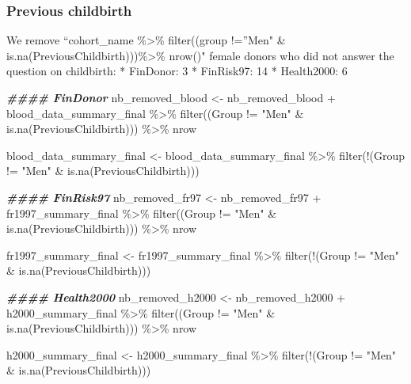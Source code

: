 \documentclass[
]{article}
\newenvironment{Shaded}{\begin{snugshade}}{\end{snugshade}}
\newcommand{\DocumentationTok}[1]{\textcolor[rgb]{0.56,0.35,0.01}{\textbf{\textit{#1}}}}
\newcommand{\FunctionTok}[1]{\textcolor[rgb]{0.00,0.00,0.00}{#1}}
\newcommand{\NormalTok}[1]{#1}
\newcommand{\OtherTok}[1]{\textcolor[rgb]{0.56,0.35,0.01}{#1}}
\newcommand{\SpecialCharTok}[1]{\textcolor[rgb]{0.00,0.00,0.00}{#1}}
\newcommand{\StringTok}[1]{\textcolor[rgb]{0.31,0.60,0.02}{#1}}
\begin{document}
\hypertarget{previous-childbirth}{%
\subsubsection{Previous childbirth}\label{previous-childbirth}}

We remove ``cohort\_name \%\textgreater\% filter((group !=''Men" \&
is.na(PreviousChildbirth)))\%\textgreater\% nrow()" female donors who
did not answer the question on childbirth: * FinDonor: 3 * FinRisk97: 14
* Health2000: 6

\begin{Shaded}
\begin{Highlighting}[]
\DocumentationTok{\#\#\#\# FinDonor}
\NormalTok{nb\_removed\_blood }\OtherTok{\textless{}{-}}\NormalTok{ nb\_removed\_blood }\SpecialCharTok{+}
\NormalTok{                            blood\_data\_summary\_final }\SpecialCharTok{\%\textgreater{}\%} \FunctionTok{filter}\NormalTok{((Group }\SpecialCharTok{!=} \StringTok{"Men"} \SpecialCharTok{\&} \FunctionTok{is.na}\NormalTok{(PreviousChildbirth))) }\SpecialCharTok{\%\textgreater{}\%}\NormalTok{ nrow }

\NormalTok{blood\_data\_summary\_final }\OtherTok{\textless{}{-}}\NormalTok{ blood\_data\_summary\_final }\SpecialCharTok{\%\textgreater{}\%} 
  \FunctionTok{filter}\NormalTok{(}\SpecialCharTok{!}\NormalTok{(Group }\SpecialCharTok{!=} \StringTok{"Men"} \SpecialCharTok{\&} \FunctionTok{is.na}\NormalTok{(PreviousChildbirth)))}

\DocumentationTok{\#\#\#\# FinRisk97}
\NormalTok{nb\_removed\_fr97 }\OtherTok{\textless{}{-}}\NormalTok{ nb\_removed\_fr97 }\SpecialCharTok{+}
\NormalTok{                            fr1997\_summary\_final }\SpecialCharTok{\%\textgreater{}\%} \FunctionTok{filter}\NormalTok{((Group }\SpecialCharTok{!=} \StringTok{"Men"} \SpecialCharTok{\&} \FunctionTok{is.na}\NormalTok{(PreviousChildbirth))) }\SpecialCharTok{\%\textgreater{}\%}\NormalTok{ nrow }

\NormalTok{fr1997\_summary\_final }\OtherTok{\textless{}{-}}\NormalTok{ fr1997\_summary\_final }\SpecialCharTok{\%\textgreater{}\%} 
  \FunctionTok{filter}\NormalTok{(}\SpecialCharTok{!}\NormalTok{(Group }\SpecialCharTok{!=} \StringTok{"Men"} \SpecialCharTok{\&} \FunctionTok{is.na}\NormalTok{(PreviousChildbirth)))}

\DocumentationTok{\#\#\#\# Health2000}
\NormalTok{nb\_removed\_h2000 }\OtherTok{\textless{}{-}}\NormalTok{ nb\_removed\_h2000 }\SpecialCharTok{+}
\NormalTok{                            h2000\_summary\_final }\SpecialCharTok{\%\textgreater{}\%} \FunctionTok{filter}\NormalTok{((Group }\SpecialCharTok{!=} \StringTok{"Men"} \SpecialCharTok{\&} \FunctionTok{is.na}\NormalTok{(PreviousChildbirth))) }\SpecialCharTok{\%\textgreater{}\%}\NormalTok{ nrow }

\NormalTok{h2000\_summary\_final }\OtherTok{\textless{}{-}}\NormalTok{ h2000\_summary\_final }\SpecialCharTok{\%\textgreater{}\%} 
  \FunctionTok{filter}\NormalTok{(}\SpecialCharTok{!}\NormalTok{(Group }\SpecialCharTok{!=} \StringTok{"Men"} \SpecialCharTok{\&} \FunctionTok{is.na}\NormalTok{(PreviousChildbirth)))}
\end{Highlighting}
\end{Shaded}
\end{document}
